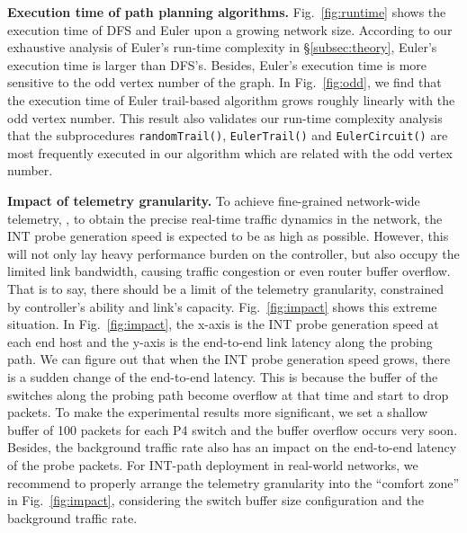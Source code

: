 \textbf{Execution time of path planning algorithms.}
Fig.~\ref{fig:runtime} shows the execution time of DFS and Euler upon a growing network size. According to our exhaustive analysis of Euler's run-time complexity in \S\ref{subsec:theory}, Euler's execution time is larger than DFS's. Besides, Euler's execution time is more sensitive to the odd vertex number of the graph. In Fig.~\ref{fig:odd}, we find that the execution time of Euler trail-based algorithm grows roughly linearly with the odd vertex number. This result also validates our run-time complexity analysis that the subprocedures \texttt{randomTrail()}, \texttt{EulerTrail()} and \texttt{EulerCircuit()} are most frequently executed in our algorithm which are related with the odd vertex number.

\textbf{Impact of telemetry granularity.}
To achieve fine-grained network-wide telemetry, \ie, to obtain the precise real-time traffic dynamics in the network, the INT probe generation speed is expected to be as high as possible. However, this will not only lay heavy performance burden on the controller, but also occupy the limited link bandwidth, causing traffic congestion or even router buffer overflow. That is to say, there should be a limit of the telemetry granularity, constrained by controller's ability and link's capacity. Fig.~\ref{fig:impact} shows this extreme situation. In Fig.~\ref{fig:impact}, the x-axis is the INT probe generation speed at each end host and the y-axis is the end-to-end link latency along the probing path. We can figure out that when the INT probe generation speed grows, there is a sudden change of the end-to-end latency. This is because the buffer of the switches along the probing path become overflow at that time and start to drop packets. To make the experimental results more significant, we set a shallow buffer of 100 packets for each P4 switch and the buffer overflow occurs very soon. Besides, the background traffic rate also has an impact on the end-to-end latency of the probe packets. For INT-path deployment in real-world networks, we recommend to properly arrange the telemetry granularity into the ``comfort zone'' in Fig.~\ref{fig:impact}, considering the switch buffer size configuration and the background traffic rate.



